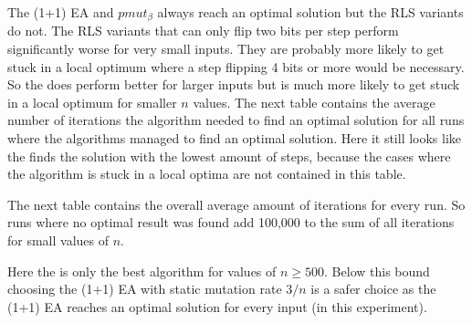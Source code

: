 The (1+1) EA and $pmut_\beta$ always reach an optimal solution but the RLS variants do not.
The RLS variants that can only flip two bits per step perform significantly worse for very small inputs.
They are probably more likely to get stuck in a local optimum where a step flipping 4 bits or more would be necessary.
So the \RLSN[2] does perform better for larger inputs but is much more likely to get stuck in a local optimum for smaller $n$ values.
The next table contains the average number of iterations the algorithm needed to find an optimal solution for all runs where the algorithms managed to find an optimal solution.
Here it still looks like the \RLSN[2] finds the solution with the lowest amount of steps, because the cases where the algorithm is stuck in a local optima are not contained in this table.



The next table contains the overall average amount of iterations for every run.
So runs where no optimal result was found add 100,000 to the sum of all iterations for small values of $n$.



Here the \RLSN[2] is only the best algorithm for values of $n \ge 500$.
Below this bound choosing the (1+1) EA with static mutation rate $3/n$ is a safer choice as the (1+1) EA reaches an optimal solution for every input (in this experiment).
